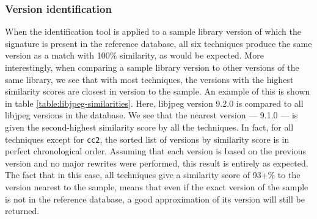 \documentclass[twocolumn,a4paper]{IEEEtran} %
\begin{document}
\subsubsection{Version identification}
\label{sec:results-version-ident}
When the identification tool is applied to a sample library version of which the signature is present in the reference database, all six techniques produce the same version as a match with 100\% similarity, as would be expected. More interestingly, when comparing a sample library version to other versions of the same library, we see that with most techniques, the versions with the highest similarity scores are closest in version to the sample. An example of this is shown in table \ref{table:libjpeg-similarities}. Here, libjpeg version 9.2.0 is compared to all libjpeg versions in the database. We see that the nearest version --- 9.1.0 --- is given the second-highest similarity score by all the techniques. In fact, for all techniques except for \texttt{cc2}, the sorted list of versions by similarity score is in perfect chronological order. Assuming that each version is based on the previous version and no major rewrites were performed, this result is entirely as expected. The fact that in this case, all techniques give a similarity score of 93+\% to the version nearest to the sample, means that even if the exact version of the sample is not in the reference database, a good approximation of its version will still be returned.
\end{document}
